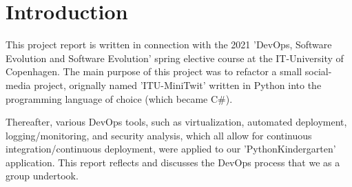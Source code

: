 \section{Introduction}
This project report is written in connection with the 2021 'DevOps, Software Evolution and Software Evolution' 
spring elective course at the IT-University of Copenhagen. 
\newline The main purpose of this project was to refactor a small social-media project, orignally 
named 'ITU-MiniTwit' written in Python into the programming language of choice (which became C\#). 

Thereafter, various DevOps tools, such as virtualization, automated deployment, logging/monitoring, and security analysis,  
which all allow for continuous integration/continuous deployment, were applied to our 'PythonKindergarten' application. 
This report reflects and discusses the DevOps process that we as a group undertook. 